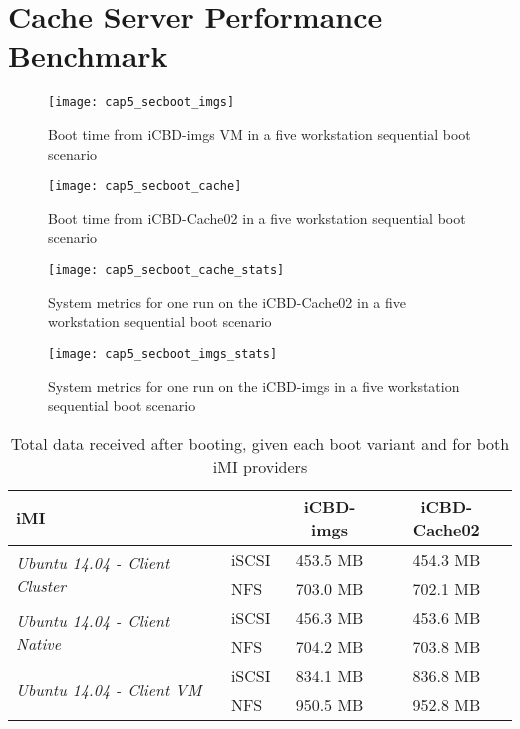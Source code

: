 





\section{Cache Server Performance Benchmark}
\label{sub:eval_cache_bench}

\begin{figure}[htbp]
	\centering
	\texttt{[image: cap5\_secboot\_imgs]}
	\caption{Boot time from iCBD-imgs VM in a five workstation sequential boot scenario}
	\label{fig:boot_imgs}
\end{figure}

\begin{figure}[htbp]
	\centering
	\texttt{[image: cap5\_secboot\_cache]}
	\caption{Boot time from iCBD-Cache02 in a five workstation sequential boot scenario}
	\label{fig:boot_cache}
\end{figure}

\begin{figure}[htbp]
	\centering
	\texttt{[image: cap5\_secboot\_cache\_stats]}
	\caption{System metrics for one run on the iCBD-Cache02 in a five workstation sequential boot scenario}
	\label{fig:boot_cache_stats}
\end{figure}

\begin{figure}[htbp]
	\centering
	\texttt{[image: cap5\_secboot\_imgs\_stats]}
	\caption{System metrics for one run on the iCBD-imgs in a five workstation sequential boot scenario}
	\label{fig:boot_imgs_stats}
\end{figure}

\begin{table}[]
\centering
\begin{tabular}{llcc}
\textbf{iMI} &  & \textbf{iCBD-imgs} & \textbf{iCBD-Cache02} \\ \hline
\multirow{2}{*}{\textit{Ubuntu 14.04 - Client Cluster}} & iSCSI & 453.5 MB & 454.3 MB \\
 & NFS & 703.0 MB & 702.1 MB \\ \hline
\multirow{2}{*}{\textit{Ubuntu 14.04 - Client Native}} & iSCSI & 456.3 MB & 453.6 MB \\
 & NFS & 704.2 MB & 703.8 MB \\ \hline
\multirow{2}{*}{\textit{Ubuntu 14.04 - Client VM}} & iSCSI & 834.1 MB & 836.8 MB \\
 & NFS & 950.5 MB & 952.8 MB
\end{tabular}
\caption{Total data received after booting, given each boot variant and for both iMI providers}
\label{tab:boot_totaldata}
\end{table}

